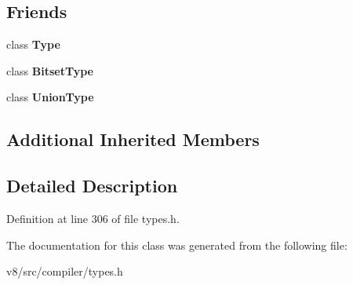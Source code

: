 \subsection*{Friends}
\begin{DoxyCompactItemize}
\item 
\mbox{\label{classv8_1_1internal_1_1compiler_1_1RangeType_a18dba29b4f3e91d6d2bc53472a6bb7cc}} 
class {\bfseries Type}
\item 
\mbox{\label{classv8_1_1internal_1_1compiler_1_1RangeType_ae1bc4470107e0fde432ac5e20204635d}} 
class {\bfseries Bitset\+Type}
\item 
\mbox{\label{classv8_1_1internal_1_1compiler_1_1RangeType_a20758df53cdcc4da5691ce9545b96c4a}} 
class {\bfseries Union\+Type}
\end{DoxyCompactItemize}
\subsection*{Additional Inherited Members}


\subsection{Detailed Description}


Definition at line 306 of file types.\+h.



The documentation for this class was generated from the following file\+:\begin{DoxyCompactItemize}
\item 
v8/src/compiler/types.\+h\end{DoxyCompactItemize}
